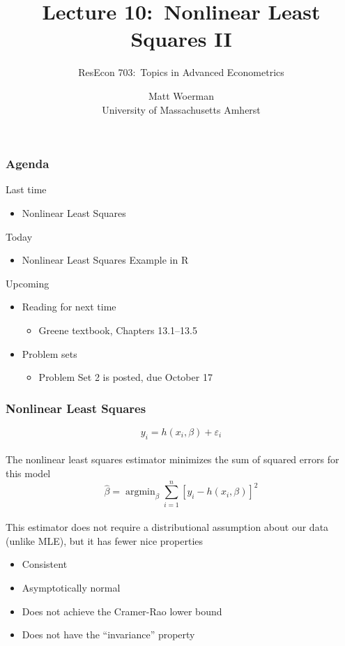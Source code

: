 \documentclass{beamer}
\title[Lecture 10:\ Nonlinear Least Squares II]{Lecture 10:\ Nonlinear Least Squares II}
\author[ResEcon 703:\ Advanced Econometrics]{ResEcon 703:\ Topics in Advanced Econometrics}
\date{Matt Woerman\\University of Massachusetts Amherst}
\DeclareMathOperator*{\argmin}{argmin}
\begin{document}
{ 
\begin{frame}[noframenumbering]
    \titlepage
\end{frame}
}

\begin{frame}\frametitle{Agenda}
    Last time
    \begin{itemize}
        \item Nonlinear Least Squares
    \end{itemize}
    \vspace{2ex}
    Today
    \begin{itemize}
        \item Nonlinear Least Squares Example in R
    \end{itemize}
    \vspace{2ex}
    Upcoming
    \begin{itemize}
        \item Reading for next time
        \begin{itemize}
            \item Greene textbook, Chapters 13.1--13.5
        \end{itemize}
        \item Problem sets
        \begin{itemize}
            \item Problem Set 2 is posted, due October 17
        \end{itemize}
    \end{itemize}
\end{frame}

\begin{frame}\frametitle{Nonlinear Least Squares}
    $$y_i = h(x_i, \beta) + \varepsilon_i$$ \\
    \vspace{2ex}
    The nonlinear least squares estimator minimizes the sum of squared errors for this model
    $$\hat{\beta} = \argmin_{\beta} \sum_{i = 1}^n [y_i - h(x_i, \beta)]^2$$ \\
    \vspace{2ex}
    This estimator does not require a distributional assumption about our data (unlike MLE), but it has fewer nice properties
    \begin{itemize}
        \item Consistent
        \item Asymptotically normal
        \item Does not achieve the Cramer-Rao lower bound
        \item Does not have the ``invariance'' property
    \end{itemize}
\end{frame}
\end{document}
